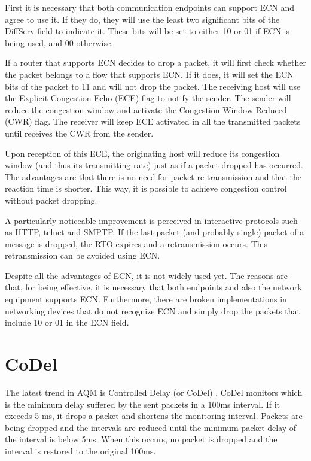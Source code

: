 First it is necessary that both communication endpoints can support ECN and agree to use it.
If they do, they will use the least two significant bits of the DiffServ field to indicate it.
These bits will be set to either 10 or 01 if ECN is being used, and 00 otherwise.

If a router that supports ECN decides to drop a packet, it will first check whether the packet belongs to a flow that supports ECN.
If it does, it will set the ECN bits of the packet to 11 and will not drop the packet.
The receiving host will use the Explicit Congestion Echo (ECE) flag to notify the sender.
The sender will reduce the congestion window and activate the Congestion Window Reduced (CWR) flag.
The receiver will keep ECE activated in all the transmitted packets until receives the CWR from the sender.

Upon reception of this ECE, the originating host will reduce its congestion window (and thus its transmitting rate) just as if a packet dropped has occurred.
The advantages are that there is no need for packet re-transmission and that the reaction time is shorter.
This way, it is possible to achieve congestion control without packet dropping.

A particularly noticeable improvement is perceived in interactive protocols such as HTTP, telnet and SMPTP.
If the last packet (and probably single) packet of a message is dropped, the RTO expires and a retransmission occurs.
This retransmission can be avoided using ECN.

Despite all the advantages of ECN, it is not widely used yet.
The reasons are that, for being effective, it is necessary that both endpoints and also the network equipment supports ECN.
Furthermore, there are broken implementations in networking devices that do not recognize ECN and simply drop the packets that include 10 or 01 in the ECN field.

\section{CoDel}
The latest trend in AQM is Controlled Delay (or CoDel) \cite{nichols2012cqd}.
CoDel monitors which is the minimum delay suffered by the sent packets in a 100ms interval.
If it exceeds 5 ms, it drops a packet and shortens the monitoring interval.
Packets are being dropped and the intervals are reduced until the minimum packet delay of the interval is below 5ms.
When this occurs, no packet is dropped and the interval is restored to the original 100ms.
